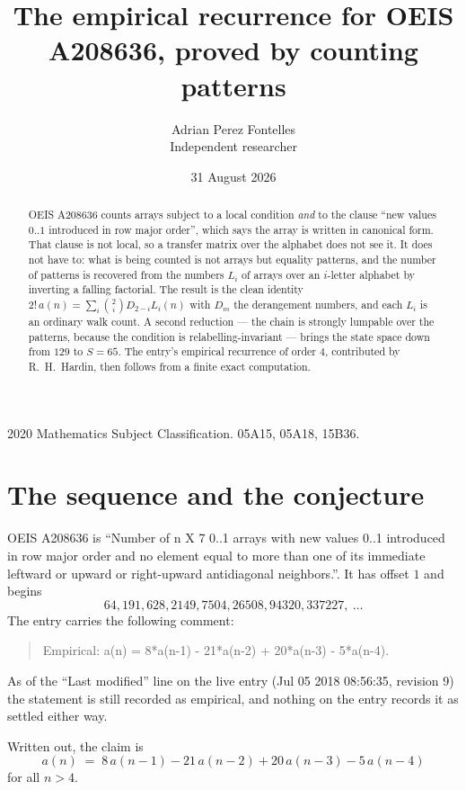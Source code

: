 \documentclass[11pt,a4paper]{article}
\title{The empirical recurrence for OEIS A208636, proved by counting patterns}
\author{Adrian Perez Fontelles\\ \small Independent researcher}
\date{31 August 2026}
\theoremstyle{plain}
\theoremstyle{definition}
\begin{document}
\maketitle

\begin{abstract}
OEIS A208636 counts arrays subject to a local condition \emph{and} to the clause ``new values
$0..1$ introduced in row major order'', which says the array is written in canonical
form. That clause is not local, so a transfer matrix over the alphabet does not see it. It
does not have to: what is being counted is not arrays but equality patterns, and the number
of patterns is recovered from the numbers $L_i$ of arrays over an $i$-letter alphabet by
inverting a falling factorial. The result is the clean identity
$2!\,a(n)=\sum_i\binom{2}{i}D_{2-i}L_i(n)$ with $D_m$ the derangement numbers,
and each $L_i$ is an ordinary walk count. A second reduction --- the chain is strongly
lumpable over the patterns, because the condition is relabelling-invariant --- brings the
state space down from $129$ to $S=65$. The entry's empirical recurrence of order
$4$, contributed by R.~H.~Hardin, then follows from a finite exact computation.
\end{abstract}

\noindent\small 2020 Mathematics Subject Classification. 05A15, 05A18, 15B36.\normalsize

\section{The sequence and the conjecture}

OEIS A208636 is ``Number of n X 7 0..1 arrays with new values 0..1 introduced in row major order and no element equal to more than one of its immediate leftward or upward or right-upward antidiagonal neighbors.''. It has offset $1$ and begins
\[
64, 191, 628, 2149, 7504, 26508, 94320, 337227,\ \dots
\]
The entry carries the following comment:
\begin{quote}\small
Empirical: a(n) = 8*a(n-1) - 21*a(n-2) + 20*a(n-3) - 5*a(n-4).
\end{quote}
As of the ``Last modified'' line on the live entry (Jul 05 2018 08:56:35, revision 9) the statement is
still recorded as empirical, and nothing on the entry records it as settled either way.

Written out, the claim is
\begin{equation}\label{eq:conj}
a(n)\;=\;8\,a(n-1) - 21\,a(n-2) + 20\,a(n-3) - 5\,a(n-4)
\end{equation}
for all $n>4$.
\end{document}
